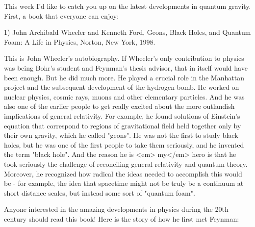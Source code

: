 

This week I'd like to catch you up on the latest developments
in quantum gravity.  First, a book that everyone can enjoy:  

1) John Archibald Wheeler and Kenneth Ford, Geons, Black Holes, and
Quantum Foam: A Life in Physics, Norton, New York, 1998.

This is John Wheeler's autobiography.  If Wheeler's only contribution to
physics was being Bohr's student and Feynman's thesis advisor, that in 
itself would have been enough.  But he did much more.  He played a
crucial role in the Manhattan project and the subsequent development of
the hydrogen bomb.  He worked on nuclear physics, cosmic rays, muons and
other elementary particles.  And he was also one of the earlier people
to get really excited about the more outlandish implications of general
relativity.  For example, he found solutions of Einstein's equation that
correspond to regions of gravitational field held together only by their
own gravity, which he called "geons".  He was not the first to study
black holes, but he was one of the first people to take them seriously,
and he invented the term "black hole".  And the reason he is <em>
my</em> hero
is that he took seriously the challenge of reconciling general
relativity and quantum theory.  Moreover, he recognized how radical the
ideas needed to accomplish this would be - for example, the idea that
spacetime might not be truly be a continuum at short distance scales,
but instead some sort of "quantum foam".  

Anyone interested in the amazing developments in physics during the 20th
century should read this book!  Here is the story of how he first met
Feynman:

